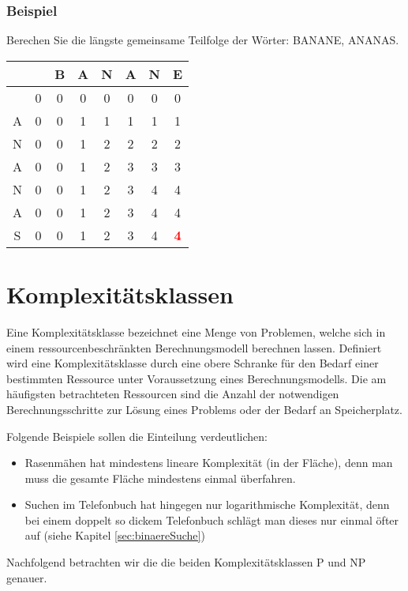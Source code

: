 \subsubsection{Beispiel}
Berechen Sie die längste gemeinsame Teilfolge  der Wörter: BANANE, ANANAS.
\begin{center}
	\begin{tabular}{c|ccccccc}
		& \ & B & A & N & A & N & E \\ \hline
		& 0 & 0 & 0 & 0 & 0 & 0 & 0 \\
	A	& 0 & 0 & 1 & 1 & 1 & 1 & 1 \\
	N	& 0 & 0 & 1 & 2 & 2 & 2 & 2 \\
	A	& 0 & 0 & 1 & 2 & 3 & 3 & 3 \\
	N	& 0 & 0 & 1 & 2 & 3 & 4 & 4 \\
	A	& 0 & 0 & 1 & 2 & 3 & 4 & 4 \\
	S	& 0 & 0 & 1 & 2 & 3 & 4 & \textbf{\textcolor{red}{4}}
	\end{tabular}
\end{center}

\section{Komplexitätsklassen}
Eine Komplexitätsklasse bezeichnet eine Menge von Problemen, welche sich in einem ressourcenbeschränkten Berechnungsmodell berechnen lassen.
Definiert wird eine Komplexitätsklasse durch eine obere Schranke für den Bedarf einer bestimmten Ressource unter Voraussetzung eines Berechnungsmodells.
Die am häufigsten betrachteten Ressourcen sind die Anzahl der notwendigen Berechnungsschritte zur Lösung eines Problems oder der Bedarf an Speicherplatz.

Folgende Beispiele sollen die Einteilung verdeutlichen:
\begin{itemize}
	\item Rasenmähen hat mindestens lineare Komplexität (in der Fläche), denn man muss die gesamte Fläche mindestens einmal überfahren.
	\item Suchen im Telefonbuch hat hingegen nur logarithmische Komplexität, denn bei einem doppelt so dickem Telefonbuch schlägt man dieses nur einmal öfter auf (siehe Kapitel \ref{sec:binaereSuche})
\end{itemize}
Nachfolgend betrachten wir die die beiden Komplexitätsklassen P und NP genauer.

